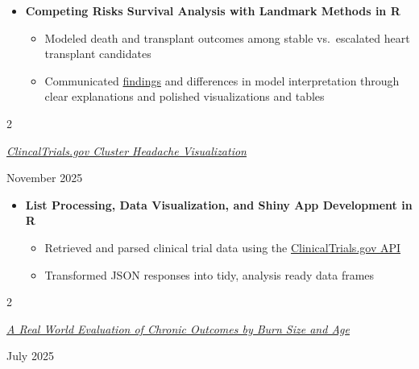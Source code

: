 \documentclass[
  16,
]{article}
\providecommand{\tightlist}{%
  \setlength{\itemsep}{0pt}\setlength{\parskip}{0pt}}
\begin{document}
\begin{itemize}
\tightlist
\item
  \textbf{Competing Risks Survival Analysis with Landmark Methods in R}

  \begin{itemize}
  \tightlist
  \item
    Modeled death and transplant outcomes among stable vs.~escalated
    heart transplant candidates
  \item
    Communicated
    \href{https://jesusrod44.github.io/portfolio/files/PosterLA.pdf}{findings}
    and differences in model interpretation through clear explanations
    and polished visualizations and tables
  \end{itemize}
\end{itemize}

\vspace{3pt}

\begin{large}
  \begin{multicols}{2}
    \begin{flushleft}
  \textit{\href{https://youtu.be/TDWX9ugJZIY}{ClincalTrials.gov Cluster Headache Visualization}}
  \end{flushleft}
    \begin{flushright}
    November 2025\end{flushright}
    \end{multicols}
  \vspace{-0.17cm}
\end{large}
\vspace{-0.16cm}

\begin{itemize}
\tightlist
\item
  \textbf{List Processing, Data Visualization, and Shiny App Development
  in R}

  \begin{itemize}
  \tightlist
  \item
    Retrieved and parsed clinical trial data using the
    \href{https://clinicaltrials.gov/data-api/api}{ClinicalTrials.gov API}
  \item
    Transformed JSON responses into tidy, analysis ready data frames
  \end{itemize}
\end{itemize}

\vspace{3pt}

\begin{large}
  \begin{multicols}{2}
    \begin{flushleft}
    \textit{\href{https://jesusrod44.github.io/portfolio/images/UTMB_poster.jpg}{A Real World Evaluation of Chronic Outcomes by Burn Size and Age}}
    \end{flushleft}
    \begin{flushright}
    July 2025\end{flushright}
    \end{multicols}
  \vspace{-0.17cm}
\end{large}
\vspace{-0.16cm}
\end{document}
